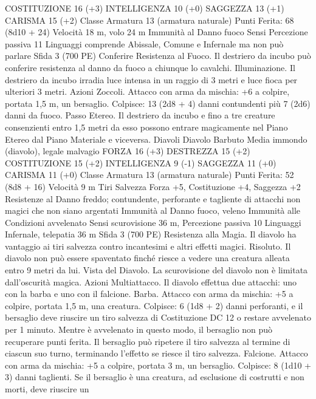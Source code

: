 \begin{multicols}{2}
COSTITUZIONE 16 (+3)
INTELLIGENZA 10 (+0)
SAGGEZZA 13 (+1)
CARISMA 15 (+2)
Classe Armatura 13 (armatura naturale)
\hspace*{0pt}\hfill{Punti Ferita}: 68 (8d10 + 24)
Velocità 18 m, volo 24 m
Immunità al Danno fuoco
Sensi Percezione passiva 11
Linguaggi comprende Abissale, Comune e Infernale ma non può
parlare
Sfida 3 (700 PE)
Conferire Resistenza al Fuoco. Il destriero da incubo può
conferire resistenza al danno da fuoco a chiunque lo cavalchi.
Illuminazione. Il destriero da incubo irradia luce intensa in un
raggio di 3 metri e luce fioca per ulteriori 3 metri.
Azioni
Zoccoli. Attacco con arma da mischia: +6 a colpire, portata 1,5
m, un bersaglio.
Colpisce: 13 (2d8 + 4) danni contundenti più 7 (2d6) danni da
fuoco.
Passo Etereo. Il destriero da incubo e fino a tre creature
consenzienti entro 1,5 metri da esso possono entrare
magicamente nel Piano Etereo dal Piano Materiale e viceversa.
Diavoli
Diavolo Barbuto
Media immondo (diavolo), legale malvagio
FORZA 16 (+3)
DESTREZZA 15 (+2)
COSTITUZIONE 15 (+2)
INTELLIGENZA 9 (-1)
SAGGEZZA 11 (+0)
CARISMA 11 (+0)
Classe Armatura 13 (armatura naturale)
\hspace*{0pt}\hfill{Punti Ferita}: 52 (8d8 + 16)
Velocità 9 m
Tiri Salvezza Forza +5, Costituzione +4, Saggezza +2
Resistenze al Danno freddo; contundente, perforante e tagliente
di attacchi non magici che non siano argentati
Immunità al Danno fuoco, veleno
Immunità alle Condizioni avvelenato
Sensi scurovisione 36 m, Percezione passiva 10
Linguaggi Infernale, telepatia 36 m
Sfida 3 (700 PE)
Resistenza alla Magia. Il diavolo ha vantaggio ai tiri salvezza
contro incantesimi e altri effetti magici.
Risoluto. Il diavolo non può essere spaventato finché riesce a
vedere una creatura alleata entro 9 metri da lui.
Vista del Diavolo. La scurovisione del diavolo non è limitata
dall’oscurità magica.
Azioni
Multiattacco. Il diavolo effettua due attacchi: uno con la barba e
uno con il falcione.
Barba. Attacco con arma da mischia: +5 a colpire, portata 1,5 m,
una creatura.
Colpisce: 6 (1d8 + 2) danni perforanti, e il bersaglio deve
riuscire un tiro salvezza di Costituzione DC 12 o restare
avvelenato per 1 minuto. Mentre è avvelenato in questo modo, il
bersaglio non può recuperare punti ferita. Il bersaglio può
ripetere il tiro salvezza al termine di ciascun suo turno,
terminando l’effetto se riesce il tiro salvezza.
Falcione. Attacco con arma da mischia: +5 a colpire, portata 3
m, un bersaglio.
Colpisce: 8 (1d10 + 3) danni taglienti. Se il bersaglio è una
creatura, ad esclusione di costrutti e non morti, deve riuscire un

\end{multicols}
